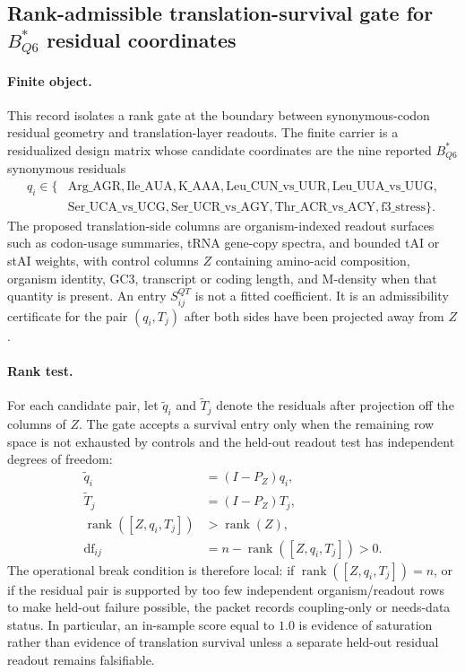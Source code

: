 \subsection{Rank-admissible translation-survival gate for $B^*_{Q6}$ residual coordinates}
\label{subsec:q6-rank-admissible-translation-survival-gate-cross-layer}

\paragraph{Finite object.}
This record isolates a rank gate at the boundary between synonymous-codon residual geometry and translation-layer readouts. The finite carrier is a residualized design matrix whose candidate coordinates are the nine reported $B^*_{Q6}$ synonymous residuals
$$
\begin{aligned}
q_i \in \{&\mathrm{Arg\_AGR},\mathrm{Ile\_AUA},\mathrm{K\_AAA},\mathrm{Leu\_CUN\_vs\_UUR},\mathrm{Leu\_UUA\_vs\_UUG},\\
&\mathrm{Ser\_UCA\_vs\_UCG},\mathrm{Ser\_UCR\_vs\_AGY},\mathrm{Thr\_ACR\_vs\_ACY},\mathrm{f3\_stress}\}.
\end{aligned}
$$
The proposed translation-side columns are organism-indexed readout surfaces such as codon-usage summaries, tRNA gene-copy spectra, and bounded tAI or stAI weights, with control columns $Z$ containing amino-acid composition, organism identity, GC3, transcript or coding length, and M-density when that quantity is present. An entry $S^{QT}_{ij}$ is not a fitted coefficient. It is an admissibility certificate for the pair $(q_i,T_j)$ after both sides have been projected away from $Z$.

\paragraph{Rank test.}
For each candidate pair, let $\widetilde q_i$ and $\widetilde T_j$ denote the residuals after projection off the columns of $Z$. The gate accepts a survival entry only when the remaining row space is not exhausted by controls and the held-out readout test has independent degrees of freedom:
$$
\begin{aligned}
\widetilde q_i &= (I-P_Z)q_i,\\
\widetilde T_j &= (I-P_Z)T_j,\\
\operatorname{rank}([Z,q_i,T_j]) &> \operatorname{rank}(Z),\\
\operatorname{df}_{ij} &= n-\operatorname{rank}([Z,q_i,T_j]) > 0.
\end{aligned}
$$
The operational break condition is therefore local: if $\operatorname{rank}([Z,q_i,T_j])=n$, or if the residual pair is supported by too few independent organism/readout rows to make held-out failure possible, the packet records coupling-only or needs-data status. In particular, an in-sample score equal to $1.0$ is evidence of saturation rather than evidence of translation survival unless a separate held-out residual readout remains falsifiable.

